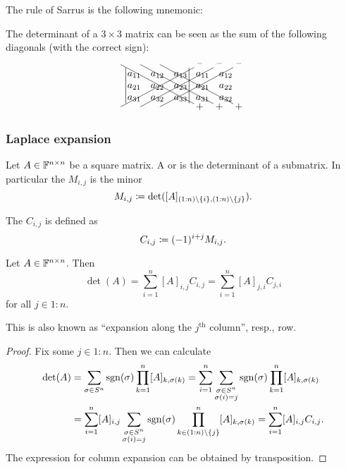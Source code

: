 The rule of Sarrus is the following mnemonic:
\begin{corollary}
The determinant of a $3\times 3$ matrix can be seen as the sum of the following diagonals (with the correct sign):
\[ \begin{tikzpicture}
\node (A) {$\begin{vmatrix}
a_{11} & a_{12} & a_{13} \\
a_{21} & a_{22} & a_{23} \\
a_{31} & a_{32} & a_{33}
\end{vmatrix}$};
\node[right of=A, node distance=5.8em] (B) {$\begin{matrix}
a_{11} & a_{12} \\
a_{21} & a_{22} \\
a_{31} & a_{32}
\end{matrix}$};
\draw (A.south west) -- ++(7.5em,4em) ++(.2,.1) node {--};
\draw (A.south west) ++(2em,0) --  ++(7.5em,4em) ++(.2,.1) node {--};
\draw (A.south west) ++(4em,0) --  ++(7.5em,4em) ++(.2,.1) node {--};
\draw (A.north west) -- ++(7.5em,-4em) ++(.2,-.1) node {+};
\draw (A.north west) ++(2em,0) --  ++(7.5em,-4em) ++(.2,-.1) node {+};
\draw (A.north west) ++(4em,0) --  ++(7.5em,-4em) ++(.2,-.1) node {+};
\end{tikzpicture} \]
\end{corollary}

\subsubsection{Laplace expansion}
\begin{definition}
Let $A\in\mathbb{F}^{n\times n}$ be a square matrix. A  or  is the determinant of a submatrix. In particular the  $M_{i,j}$ is the minor
\[ M_{i,j} \coloneqq \det([A]_{(1:n)\setminus\{i\},(1:n)\setminus\{j\}}). \]

The  $C_{i,j}$ is defined as
\[ C_{i,j} \coloneqq (-1)^{i+j}M_{i,j}. \]
\end{definition}
\begin{proposition} \label{LaplaceExpansion}
Let $A\in\mathbb{F}^{n\times n}$. Then
\[ \det(A) = \sum_{i=1}^n [A]_{i,j}C_{i,j} = \sum_{i=1}^n [A]_{j,i}C_{j,i} \]
for all $j\in 1:n$.
\end{proposition}
This is also known as ``expansion along the $j^\text{th}$ column'', resp., row.
\begin{proof}
Fix some $j\in 1:n$. Then we can calculate
\begin{align*}
\det(A) &=  \sum_{\sigma\in S^n}\operatorname{sgn}(\sigma)\prod_{k=1}^n[A]_{k,\sigma(k)} = \sum_{i=1}^n\sum_{\substack{\sigma\in S^n \\ \sigma(i)=j}}\operatorname{sgn}(\sigma)\prod_{k=1}^n[A]_{k,\sigma(k)} \\
&= \sum_{i=1}^n [A]_{i,j}\sum_{\substack{\sigma\in S^n \\ \sigma(i)=j}}\operatorname{sgn}(\sigma)\prod_{k\in (1:n)\setminus\{j\}}^n[A]_{k,\sigma(k)} = \sum_{i=1}^n [A]_{i,j}C_{i,j}.
\end{align*}
The expression for column expansion can be obtained by transposition.
\end{proof}

